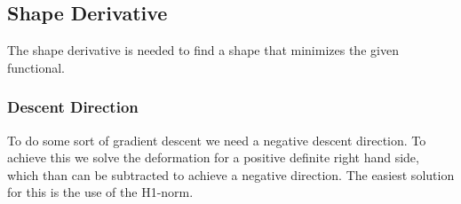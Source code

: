 \subsection{Shape Derivative}\label{}
The shape derivative is needed to find a shape that minimizes the given functional.

\subsubsection{Descent Direction}
To do some sort of gradient descent we need a negative descent direction. To achieve this we solve the deformation for a positive definite right hand side, which than can be subtracted to achieve a negative direction.
The easiest solution for this is the use of the H1-norm.